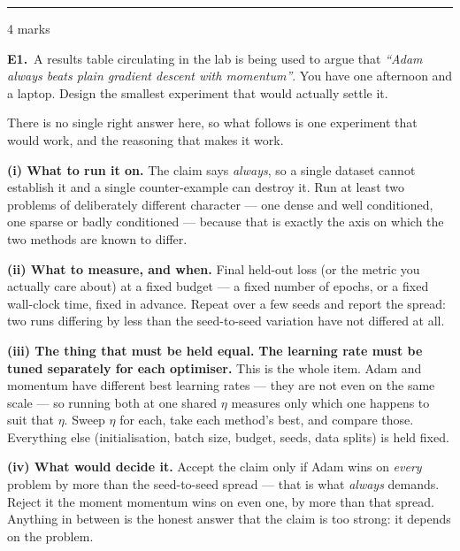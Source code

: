 \documentclass[10pt,a4paper]{article}
\newcommand{\parthead}[2]{\vspace{2pt}\noindent\rule{\linewidth}{0.4pt}\par\vspace{2pt}%
  \noindent{\bfseries Part #1}\hfill{\small #2}\par\vspace{1pt}}
\begin{document}
\newpage

\parthead{E --- Reasoning}{4 marks}

\textbf{E1.}\ A results table circulating in the lab is being used to argue that \emph{``Adam always beats plain
gradient descent with momentum''}. You have one afternoon and a laptop. Design the smallest experiment that
would actually settle it.

\vspace{4pt}

There is no single right answer here, so what follows is one experiment that would work, and the reasoning that makes it work.\par\vspace{1mm}\textbf{(i) What to run it on.} The claim says \emph{always}, so a single dataset cannot establish it and a single counter-example can destroy it. Run at least two problems of deliberately different character --- one dense and well conditioned, one sparse or badly conditioned --- because that is exactly the axis on which the two methods are known to differ.\par\vspace{1mm}\textbf{(ii) What to measure, and when.} Final held-out loss (or the metric you actually care about) at a fixed budget --- a fixed number of epochs, or a fixed wall-clock time, fixed in advance. Repeat over a few seeds and report the spread: two runs differing by less than the seed-to-seed variation have not differed at all.\par\vspace{1mm}\textbf{(iii) The thing that must be held equal.} \textbf{The learning rate must be tuned separately for each optimiser.} This is the whole item. Adam and momentum have different best learning rates --- they are not even on the same scale --- so running both at one shared $\eta$ measures only which one happens to suit that $\eta$. Sweep $\eta$ for each, take each method's best, and compare those. Everything else (initialisation, batch size, budget, seeds, data splits) is held fixed.\par\vspace{1mm}\textbf{(iv) What would decide it.} Accept the claim only if Adam wins on \emph{every} problem by more than the seed-to-seed spread --- that is what \emph{always} demands. Reject it the moment momentum wins on even one, by more than that spread. Anything in between is the honest answer that the claim is too strong: it depends on the problem.

\vfill
\end{document}
